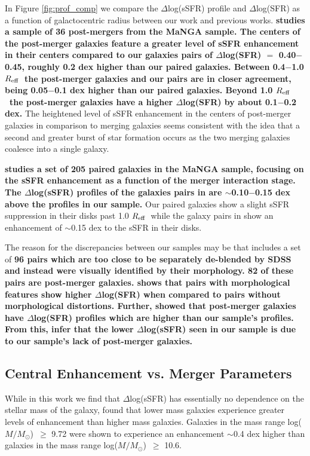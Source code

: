 \documentclass[iop,revtex4,twocolumn,apj,numberedappendix,appendixfloats]{emulateapj}
\newcommand{\reff}{$R_{\rm eff}$}
\newcommand{\logm}{log($M/M_{\odot}$)}
\begin{document}
In Figure \ref{fig:prof_comp} we compare the $\Delta$log(sSFR) profile and $\Delta$log(SFR) as a function of galactocentric radius between our work and previous works. \textbf{\citet{Thorp:2019} studies a sample of 36 post-mergers from the MaNGA sample. The centers of the post-merger galaxies feature a greater level of sSFR enhancement in their centers compared to our galaxies pairs of $\Delta$log(SFR) $=$ 0.40$-$0.45, roughly 0.2 dex higher than our paired galaxies. Between 0.4$-$1.0\reff\ the post-merger galaxies and our pairs are in closer agreement, being 0.05$-$0.1 dex higher than our paired galaxies. Beyond 1.0 \reff\ the post-merger galaxies have a higher $\Delta$log(SFR) by about 0.1$-$0.2 dex.} The heightened level of sSFR enhancement in the centers of post-merger galaxies in comparison to merging galaxies seems consistent with the idea that a second and greater burst of star formation occurs as the two merging galaxies coalesce into a single galaxy. 

\textbf{\citet{Pan:2019} studies a set of 205 paired galaxies in the MaNGA sample, focusing on the sSFR enhancement as a function of the merger interaction stage. The $\Delta$log(sSFR) profiles of the galaxies pairs in \citet{Pan:2019} are $\sim$0.10$-$0.15 dex above the profiles in our sample.} Our paired galaxies show a slight sSFR suppression in their disks past 1.0 \reff\ while the galaxy pairs in \citet{Pan:2019} show an enhancement of $\sim$0.15 dex to the sSFR in their disks. 

The reason for the discrepancies between our samples may be that \citet{Pan:2019} includes a set of \textbf{96 pairs which are too close to be separately de-blended by SDSS and instead were visually identified by their morphology. 82 of these pairs are post-merger galaxies. \citet{Pan:2019} shows that pairs with morphological features show higher $\Delta$log(SFR) when compared to pairs without morphological distortions. Further, \citet{Thorp:2019} showed that post-merger galaxies have $\Delta$log(SFR) profiles which are higher than our sample's profiles. From this, infer that the lower $\Delta$log(sSFR) seen in our sample is due to our sample's lack of post-merger galaxies. }

\subsection{Central Enhancement vs. Merger Parameters}

While in this work we find that $\Delta$log(sSFR) has essentially no dependence on the stellar mass of the galaxy, \citet{Li:2008} found that lower mass galaxies experience greater levels of enhancement than higher mass galaxies. Galaxies in the mass range \logm\ $\ge$ 9.72 were shown to experience an enhancement $\sim$0.4 dex higher than galaxies in the mass range \logm\ $\ge$ 10.6. 
\end{document}
